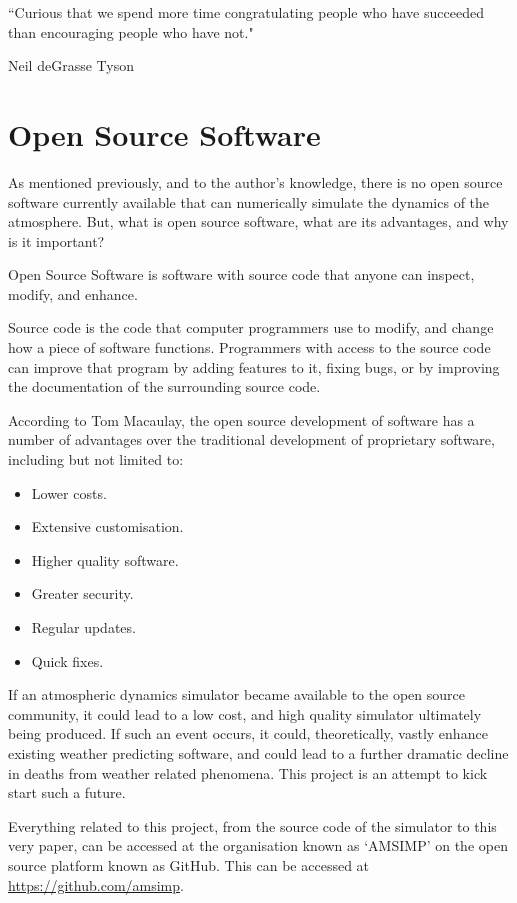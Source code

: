\epigraph{``Curious that we spend more time congratulating people who have succeeded than encouraging people who have not."}{Neil deGrasse Tyson}

\section{Open Source Software}
As mentioned previously, and to the author's knowledge, there is no open source software currently available that can numerically simulate the dynamics of the atmosphere. But, what is open source software, what are its advantages, and why is it important?

\begin{definition}
Open Source Software is software with source code that anyone can inspect, modify, and enhance. 
\end{definition}

Source code is the code that computer programmers use to modify, and change how a piece of software functions\cite{what_oss}. Programmers with access to the source code can improve that program by adding features to it, fixing bugs, or by improving the documentation of the surrounding source code. 

According to Tom Macaulay\cite{advantages}, the open source development of software has a number of advantages over the traditional development of proprietary software, including but not limited to:

\begin{itemize}
    \item Lower costs.
    \item Extensive customisation.
    \item Higher quality software.
    \item Greater security.
    \item Regular updates.
    \item Quick fixes.
\end{itemize}

If an atmospheric dynamics simulator became available to the open source community, it could lead to a low cost, and high quality simulator ultimately being produced. If such an event occurs, it could, theoretically, vastly enhance existing weather predicting software, and could lead to a further dramatic decline in deaths from weather related phenomena. This project is an attempt to kick start such a future.

Everything related to this project, from the source code of the simulator to this very paper, can be accessed at the organisation known as `AMSIMP' on the open source platform known as GitHub. This can be accessed at \url{https://github.com/amsimp}. 

